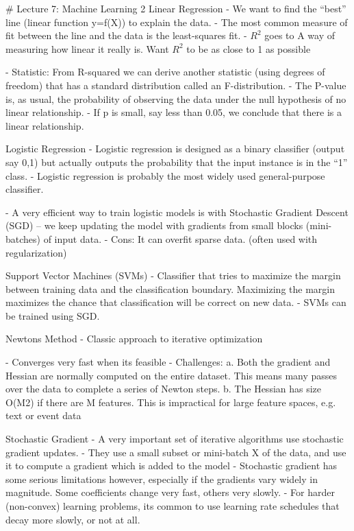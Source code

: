 \documentclass[3pt,landscape]{article}
\begin{document}
\begin{multicols}{3}
\# Lecture 7: Machine Learning 2
Linear Regression
- We want to find the “best” line (linear function y=f(X)) to explain the data.
- The most common measure of fit between the line and the data is the least-squares fit. 
- $R^2$ goes to A way of measuring how linear it really is. Want $R^2$ to be as close to 1 as possible

- Statistic: From R-squared we can derive another statistic (using degrees of freedom) that has a standard distribution called an F-distribution.
  -  The P-value is, as usual, the probability of observing the data under the null hypothesis of no linear relationship. 
  - If p is small, say less than 0.05, we conclude that there is a linear relationship.

Logistic Regression
- Logistic regression is designed as a binary classifier (output say {0,1}) but actually outputs the probability that the input instance is in the “1” class. 
- Logistic regression is probably the most widely used general-purpose classifier. 

- A very efficient way to train logistic models is with Stochastic Gradient Descent (SGD) – we keep updating the model with gradients from small blocks (mini-batches) of input data. 
- Cons: It can overfit sparse data. (often used with regularization)

Support Vector Machines (SVMs)
- Classifier that tries to maximize the margin between training data and the classification boundary. Maximizing the margin maximizes the chance that classification will be correct on new data. 
- SVMs can be trained using SGD.

Newtons Method
- Classic approach to iterative optimization

- Converges very fast when its feasible 
- Challenges:
  a. Both the gradient and Hessian are normally computed on the entire dataset. This means many passes over the data to complete a series of Newton steps.
  b. The Hessian has size O(M2) if there are M features. This is impractical for large feature spaces, e.g. text or event data 

Stochastic Gradient 
- A very important set of iterative algorithms use stochastic gradient updates. 
- They use a small subset or mini-batch X of the data, and use it to compute a gradient which is added to the model 
- Stochastic gradient has some serious limitations however, especially if the gradients vary widely in magnitude. Some coefficients change very fast, others very slowly.
- For harder (non-convex) learning problems, its common to use learning rate schedules that decay more slowly, or not at all. 


\end{multicols}
\end{document}
